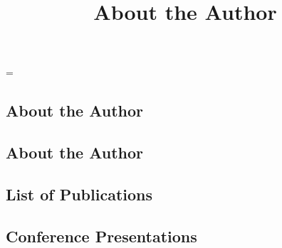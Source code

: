 \emergencystretch=\maxdimen
{}


\begin{refsection}

\title{About the Author}

\chapter{About the Author}

\vspace{-2cm}

\section*{About the Author}


\section*{List of Publications}


\section*{Conference Presentations}


\end{refsection}
\RemoveLabels